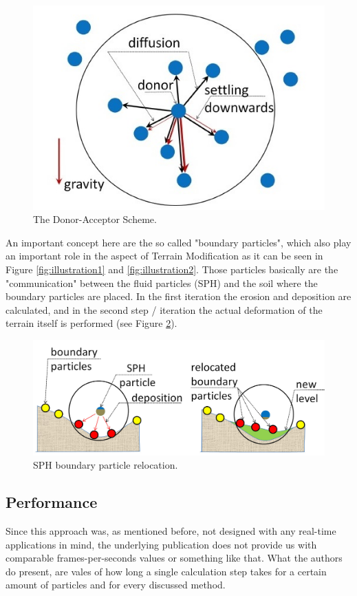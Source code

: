 \begin{figure}[htb]
	\centering
	\includegraphics[width=\linewidth]{KBKS09/donoracceptor.jpg}
	\caption{The Donor-Acceptor Scheme.}
	\label{fig:donoracceptor}
\end{figure}

An important concept here are the so called "boundary particles", which also play an important role in the aspect of Terrain Modification as it can be seen in Figure \ref{fig:illustration1} and \ref{fig:illustration2}. Those particles basically are the "communication" between the fluid particles (SPH) and the soil where the boundary particles are placed. In the first iteration the erosion and deposition are calculated, and in the second step / iteration the actual deformation of the terrain itself is performed (see Figure \ref{fig:boundary2}). 

\begin{figure}[htb]
	\centering
	\includegraphics[width=\linewidth]{KBKS09/boundary2.jpg}
	\caption{SPH boundary particle relocation.}
	\label{fig:boundary2}
\end{figure}

\subsection{Performance}
Since this approach was, as mentioned before, not designed with any real-time applications in mind, the underlying publication does not provide us with comparable frames-per-seconds values or something like that. What the authors do present, are vales of how long a single calculation step takes for a certain amount of particles and for every discussed method.

